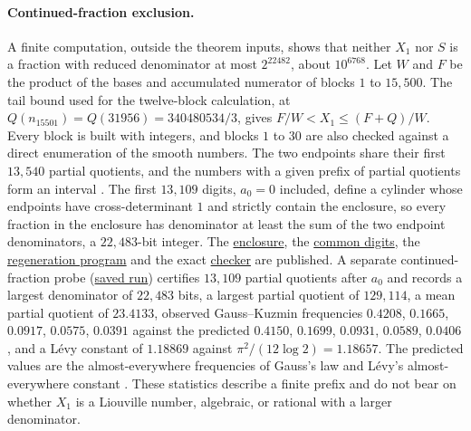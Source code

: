 \paragraph{Continued-fraction exclusion.}
\label{long269:res:cf-exclusion}
A finite computation, outside the theorem inputs, shows that neither
$X_1$ nor $S$ is a fraction with reduced denominator at most
$2^{22482}$, about $10^{6768}$.  Let $W$ and $F$ be the product of the bases and
accumulated numerator of blocks $1$ to $15{,}500$.  The tail bound used
for the twelve-block calculation, at $Q(n_{15501})=Q(31956)=340480534/3$,
gives $F/W<X_1\le(F+Q)/W$.  Every block is built with integers, and
blocks $1$ to $30$ are also checked against a direct enumeration of the
smooth numbers.  The two endpoints share their first $13{,}540$ partial
quotients, and the numbers with a given prefix of partial quotients form
an interval \cite[Lemma~10.1.2, p.~106]{bosmaCF}.  The first $13{,}109$
digits, $a_0=0$ included, define a cylinder whose endpoints have
cross-determinant $1$ and strictly contain the enclosure, so every
fraction in the enclosure has denominator at least the sum of the two
endpoint denominators, a $22{,}483$-bit integer.  The
\href{https://github.com/wcook04/plectis-erdos/blob/f757115e03bebe5c04431a147da559015c680a37/research/experiments/erdos269/large-computations/regenerated/tail_certificate.json}{enclosure},
the
\href{https://github.com/wcook04/plectis-erdos/blob/f757115e03bebe5c04431a147da559015c680a37/research/experiments/erdos269/large-computations/regenerated/cf_common_prefix.json}{common digits},
the
\href{https://github.com/wcook04/plectis-erdos/blob/f757115e03bebe5c04431a147da559015c680a37/research/experiments/erdos269/large-computations/regenerate_269.py}{regeneration program}
and the exact
\href{https://github.com/wcook04/plectis-erdos/blob/f757115e03bebe5c04431a147da559015c680a37/research/experiments/erdos269/large-computations/verify_recovered.py}{checker}
are published.  A separate continued-fraction probe
(\href{https://github.com/wcook04/plectis-erdos/blob/f757115e03bebe5c04431a147da559015c680a37/research/experiments/erdos269/large-computations/receipts/cf-statistics.json}{saved run})
certifies $13{,}109$ partial quotients after $a_0$ and records
a largest denominator of $22{,}483$ bits, a largest partial quotient of
$129{,}114$, a mean partial quotient of $23.4133$, observed Gauss--Kuzmin
frequencies $0.4208$, $0.1665$, $0.0917$, $0.0575$, $0.0391$ against the
predicted $0.4150$, $0.1699$, $0.0931$, $0.0589$, $0.0406$, and a L\'evy
constant of $1.18869$ against $\pi^{2}/(12\log2)=1.18657$.  The predicted
values are the almost-everywhere frequencies of Gauss's law and L\'evy's
almost-everywhere constant \cite[pp.~288--289 and footnote~5]{levy1936}.
These statistics describe a finite prefix and do not bear on whether $X_1$ is a
Liouville number, algebraic, or rational with a larger denominator.

